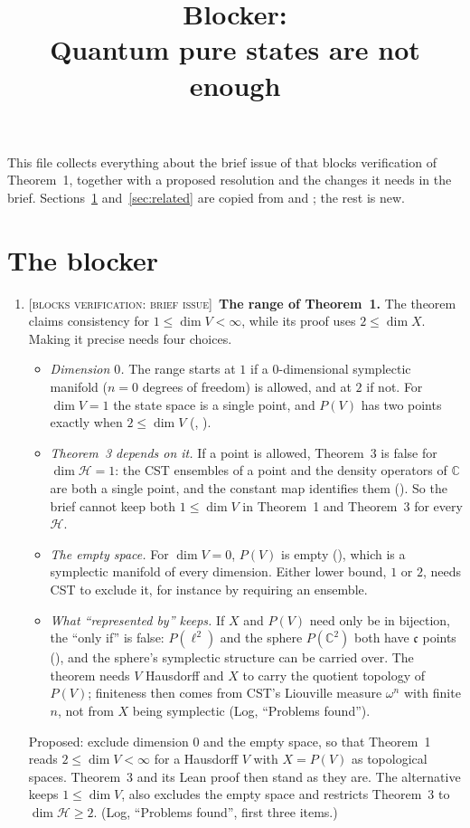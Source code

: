 \documentclass[11pt]{article}
\title{Blocker:\\ Quantum pure states are not enough}
\author{}
\date{}
\newcommand{\blocker}[1]{\textsc{[blocks verification: #1]}~}
\begin{document}
\maketitle

\noindent
This file collects everything about the brief issue of  that blocks
verification of Theorem~1, together with a proposed resolution and the changes it needs in the
brief. Sections~\ref{sec:blocker} and~\ref{sec:related} are copied from
 and ; the rest is new.

\section{The blocker}\label{sec:blocker}
\begin{enumerate}
\item \blocker{brief issue}\textbf{The range of Theorem~1.} The theorem claims consistency for
  $1 \le \dim V < \infty$, while its proof uses $2 \le \dim X$. Making it precise needs four
  choices.
  \begin{itemize}
  \item \emph{Dimension $0$.} The range starts at $1$ if a $0$-dimensional symplectic manifold
    ($n = 0$ degrees of freedom) is allowed, and at $2$ if not. For $\dim V = 1$ the state space
    is a single point, and $P(V)$ has two points exactly when $2 \le \dim V$
    (, ).
  \item \emph{Theorem~3 depends on it.} If a point is allowed, Theorem~3 is false for
    $\dim\mathcal H = 1$: the CST ensembles of a point and the density operators of
    $\mathbb C$ are both a single point, and the constant map identifies them
    (). So the brief cannot keep both
    $1 \le \dim V$ in Theorem~1 and Theorem~3 for every $\mathcal H$.
  \item \emph{The empty space.} For $\dim V = 0$, $P(V)$ is empty
    (), which is a symplectic manifold of every dimension. Either
    lower bound, $1$ or $2$, needs CST to exclude it, for instance by requiring an ensemble.
  \item \emph{What ``represented by'' keeps.} If $X$ and $P(V)$ need only be in bijection, the
    ``only if'' is false: $P(\ell^2)$ and the sphere $P(\mathbb C^2)$ both have $\mathfrak c$
    points (), and the sphere's symplectic structure can be
    carried over. The theorem needs $V$ Hausdorff and $X$ to carry the quotient topology of
    $P(V)$; finiteness then comes from CST's Liouville measure $\omega^n$ with finite $n$, not
    from $X$ being symplectic (Log, ``Problems found'').
  \end{itemize}
  Proposed: exclude dimension $0$ and the empty space, so that Theorem~1 reads
  $2 \le \dim V < \infty$ for a Hausdorff $V$ with $X = P(V)$ as topological spaces. Theorem~3
  and its Lean proof then stand as they are. The alternative keeps $1 \le \dim V$, also
  excludes the empty space and restricts Theorem~3 to $\dim\mathcal H \ge 2$. (Log, ``Problems
  found'', first three items.)
\end{enumerate}
\end{document}
